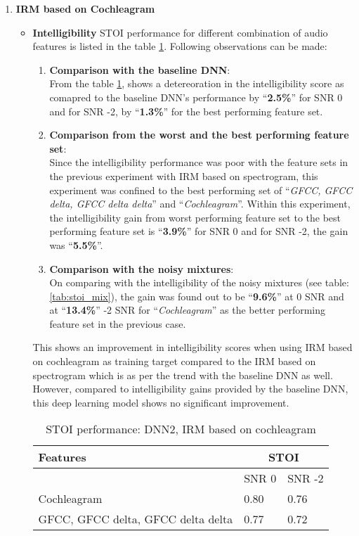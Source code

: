 \begin{enumerate}
\item \textbf{IRM based on Cochleagram}
\begin{itemize}
\item \textbf{Intelligibility}
STOI performance for different combination of audio features is listed in the table \ref{tab:dnn_1_stoi_2}. Following observations can be made:\\
\begin{enumerate}
\item \textbf{Comparison with the baseline DNN}:\\
From the table \ref{tab:dnn_1_stoi_2}, shows a detereoration in the intelligibility score as comapred to the baseline DNN's performance by \enquote{\textbf{2.5\%}} for SNR 0 and for SNR -2, by \enquote{\textbf{1.3\%}} for the best performing feature set.
\item \textbf{Comparison from the worst and the best performing feature set}:\\
Since the intelligibility performance was poor with the feature sets in the previous experiment with IRM based on spectrogram, this experiment was confined to the best performing set of \enquote{\textit{GFCC, GFCC delta, GFCC delta delta}} and \enquote{\textit{Cochleagram}}. Within this experiment, the intelligibility gain from worst performing feature set to the best performing feature set is \enquote{\textbf{3.9\%}} for SNR 0 and for SNR -2, the gain was \enquote{\textbf{5.5\%}}.
\item \textbf{Comparison with the noisy mixtures}:\\
On comparing with the intelligibility of the noisy mixtures (see table: \ref{tab:stoi_mix}), the gain was found out to be \enquote{\textbf{9.6\%}} at 0 SNR and at \enquote{\textbf{13.4\%}} -2 SNR for \enquote{\textit{Cochleagram}} as the better performing feature set in the previous case.
\end{enumerate}
This shows an improvement in intelligibility scores when using IRM based on cochleagram as training target compared to the IRM based on spectrogram which is as per the trend with the baseline DNN as well. However, compared to intelligibility gains provided by the baseline DNN, this deep learning model shows no significant improvement.
\begin{table}[!htbp]
\centering
\begin{tabular}{ |p{12cm}|p{1.7cm}|p{1.7cm}|  }
\hline
\textbf{Features} & \multicolumn{2}{|c|}{\textbf{STOI}} \\
\hline
\cellcolor{black} & SNR 0 & SNR -2\\
\hline
\rowcolor[HTML]{ADD8E6}Cochleagram	& 0.80	& 0.76\\
\hline
GFCC, GFCC delta, GFCC delta delta & 0.77	& 0.72\\
\hline
\end{tabular}
\caption{STOI performance: DNN2, IRM based on cochleagram}
\label{tab:dnn_1_stoi_2}
\end{table}


\end{itemize}
\end{enumerate}
